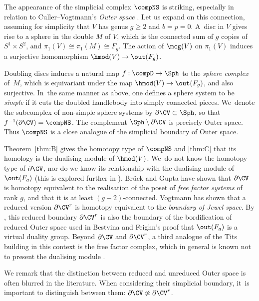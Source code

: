 \begin{rem}\label{rem: connection to outer space}
The appearance of the simplicial complex $\compNS$ is striking, especially in relation to Culler--Vogtmann's \emph{Outer space} \cite{cv}. Let us expand on this connection, assuming for simplicity that $V$ has genus $g\geq2$ and $b=p=0$. A~disc in $V$ gives rise to a sphere in the double $M$ of $V$, which is the connected sum of $g$ copies of $S^1 \times S^2$, and $\pi_1(V)\cong\pi_1(M)\cong F_g$. The action of $\mcg(V)$ on $\pi_1(V)$ induces a surjective homomorphism $\hmod(V) \to \out(F_g)$.

Doubling discs induces a natural map $f:\compD \to \Sph$ to the \emph{sphere complex} of~$M$, which is equivariant under the map $\hmod(V) \to \out(F_g)$, and also surjective. In~the same manner as above, one defines a sphere system to be \emph{simple} if it cuts the doubled handlebody into simply connected pieces. We~denote the subcomplex of non-simple sphere systems by $\partial \CV \subset \Sph$, so that $f^{-1}(\partial \CV) = \compNS$. The complement $\Sph \setminus\nobreak \partial \CV$ is precisely Outer space. Thus $\compNS$ is a close analogue of the simplicial boundary of Outer space.

Theorem~\ref{thm:B} gives the homotopy type of $\compNS$ and \cref{thm:C} that its homology is the dualising module of $\hmod(V)$. We~do not know the homotopy type of $\partial \CV$, nor do we know its relationship with the dualising module of $\out(F_g)$ (this is explored further in \cite{WW}). Brück and Gupta \cite[Th.\,2]{bruck-gupta} have shown that $\partial \CV$ is homotopy equivalent to the realisation of the poset of \emph{free factor systems} of rank $g$, and that it is at least $(g-2)$-connected. Vogtmann \cite{vogtmann} has shown that a reduced version $\partial \CV^r$ is homotopy equivalent to the \emph{boundary of Jewel space}. By \cite{bsv}, this reduced boundary $\partial \CV^r$ is also the boundary of the bordification of reduced Outer space used in Bestvina and Feighn's proof that $\out(F_g)$ is a virtual duality group. Beyond $\partial \CV$ and $\partial \CV^r$, a third analogue of the Tits building in this context is the free factor complex, which in general is known not to present the dualising module \cite{hmnp}.

We remark that the distinction between reduced and unreduced Outer space is often blurred in the literature. When considering their simplicial boundary, it~is important to distinguish between them: $\partial \CV \not\simeq \partial\CV^r $.
\end{rem}

